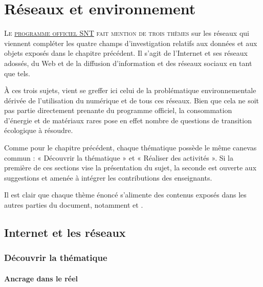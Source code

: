 \chapter[Réseaux et environnement]{Réseaux et environnement}
\label{chap:IX}

\lettrine{L}{e \href{https://eduscol.education.fr/cid143713/snt-bac-2021.html}{programme officiel SNT} fait mention de trois thèmes} sur les réseaux qui viennent compléter les quatre champs d'investigation relatifs aux données et aux objets exposés dans le chapitre précédent. Il s'agit de l'Internet et ses réseaux adossés, du Web et de la diffusion d'information et des réseaux sociaux en tant que tels. 

À ces trois sujets, vient se greffer ici celui de la problématique environnementale dérivée de l'utilisation du numérique et de tous ces réseaux. Bien que cela ne soit pas partie directement prenante du programme officiel, la consommation d'énergie et de matériaux rares pose en effet nombre de questions de transition écologique à résoudre.

Comme pour le chapitre précédent, chaque thématique possède le même canevas commun : « Découvrir la thématique » et « Réaliser des activités ». Si la première de ces sections vise la présentation du sujet, la seconde est ouverte aux suggestions et amenée à intégrer les contributions des enseignants. 

Il est clair que chaque thème énoncé s'alimente des contenus exposés dans les autres parties du document, notamment  et .



\section[Internet et les réseaux]{Internet et les réseaux}
\label{sec:IX.1}


\subsection[Découvrir la thématique]{Découvrir la thématique}
\label{sub:IX.1.1}

\subsubsection[Ancrage dans le réel]{Ancrage dans le réel}
\label{subsub:IX.1.1.1}


